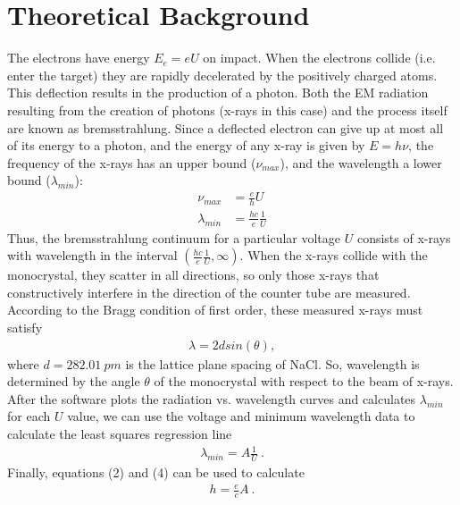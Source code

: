 \documentclass[aps,prl,preprint,groupedaddress]{revtex4-2}
\begin{document}
\section{Theoretical Background}
    The electrons have energy $E_e = eU$ on impact. When the electrons collide (i.e. enter the  target) they are rapidly decelerated by the positively charged  atoms. This deflection results in the production of a photon. Both the EM radiation resulting from the creation of photons (x-rays in this case) and the process itself are known as bremsstrahlung. Since a deflected electron can give up at most all of its energy to a photon, and the energy of any x-ray is given by $E = h\nu$, the frequency of the x-rays has an upper bound ($\nu_{max}$), and the wavelength a lower bound ($\lambda_{min}$):
    \begin{align}
        \nu_{max} &= \frac{e}{h}U\\
        \lambda_{min} &= \frac{hc}{e}\frac{1}{U}
    \end{align}
    Thus, the bremsstrahlung continuum for a particular voltage $U$ consists of x-rays with wavelength in the interval $(\frac{hc}{e}\frac{1}{U}, \infty)$. When the x-rays collide with the  monocrystal, they scatter in all directions, so only those x-rays that constructively interfere in the direction of the counter tube are measured. According to the Bragg condition of first order, these measured x-rays must satisfy
    \begin{align}
        \lambda = 2 d sin(\theta),
    \end{align}
    where $d = 282.01~\si{pm}$ is the lattice plane spacing of NaCl. So, wavelength is determined by the angle $\theta$ of the monocrystal with respect to the beam of x-rays. After the software plots the radiation vs. wavelength curves and calculates $\lambda_{min}$ for each $U$ value, we can use the voltage and minimum wavelength data to calculate the least squares regression line
    \begin{align}
        \lambda_{min} = A \frac{1}{U}~.
    \end{align}
    Finally, equations (2) and (4) can be used to calculate 
    \begin{align}
        h = \frac{e}{c} A~.
    \end{align}
    
\end{document}
